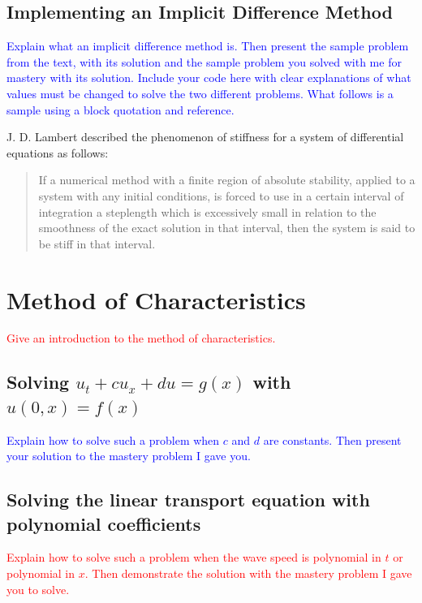 \documentclass{article}
\newcommand{\red}[1]{\textcolor{red}{#1}}
\newcommand{\blue}[1]{\textcolor{blue}{#1}}
\begin{document}
\subsection{Implementing an Implicit Difference Method}
\blue{Explain what an implicit difference method is. Then present the sample problem from the text, with its solution and the sample problem you solved with me for mastery with its solution. Include your code here with clear explanations of what values must be changed to solve the two different problems. What follows is a sample using a block quotation and reference.}

J. D. Lambert described the phenomenon of stiffness for a system of
differential equations as follows:
\begin{quote} If a numerical method with a finite region of absolute stability,
    applied to a system with any initial conditions, is forced to use in a
    certain interval of integration a steplength which is excessively small in
    relation to the smoothness of the exact solution in that interval, then the
    system is said to be stiff in that interval. \cite{wikistiff}
    \end{quote}

\section{Method of Characteristics}
\red{Give an introduction to the method of characteristics.}

\subsection{Solving $u_t+cu_x +du = g(x)$ with $u(0,x)=f(x)$}
\blue{Explain how to solve such a problem when $c$ and $d$ are constants. Then present your solution to the mastery problem I gave you.}

\subsection{Solving the linear transport equation with polynomial coefficients}
\red{Explain how to solve such a problem when the wave speed is polynomial in $t$ or polynomial in $x$. Then demonstrate the solution with the mastery problem I gave you to solve.}
\end{document}
